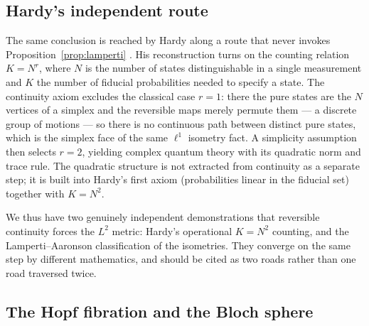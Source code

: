 \subsection{Hardy's independent route}
\label{sec:hardy-route}

The same conclusion is reached by Hardy along a route that never invokes
Proposition~\ref{prop:lamperti} \autocite{Hardy2001a}. His reconstruction turns on
the counting relation $K=N^{r}$, where $N$ is the number of states
distinguishable in a single measurement and $K$ the number of fiducial
probabilities needed to specify a state. The continuity axiom excludes the
classical case $r=1$: there the pure states are the $N$ vertices of a simplex and
the reversible maps merely permute them --- a discrete group of motions --- so there is no
continuous path between distinct pure states, which is the simplex face of the same $\ell^{1}$
isometry fact. A simplicity assumption then selects $r=2$, yielding complex
quantum theory with its quadratic norm and trace rule. The quadratic structure is
not extracted from continuity as a separate step; it is built into Hardy's first
axiom (probabilities linear in the fiducial set) together with $K=N^{2}$.

We thus have two genuinely independent demonstrations that reversible continuity
forces the $L^{2}$ metric: Hardy's operational $K=N^{2}$ counting, and the
Lamperti--Aaronson classification of the isometries. They converge on the same
step by different mathematics, and should be cited as two roads rather than one
road traversed twice.

\subsection{The Hopf fibration and the Bloch sphere}
\label{sec:hopf-bloch}

